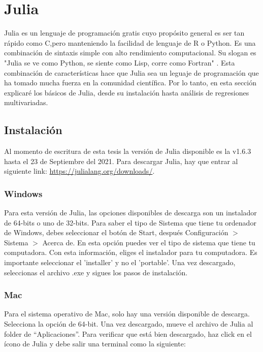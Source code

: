 \chapter{Julia}

Julia es un lenguaje de programación gratis cuyo propósito general es ser tan rápido como C,pero manteniendo la facilidad de lenguaje de R o Python. Es una combinación de sintaxis simple con alto rendimiento computacional. Su slogan es "Julia se ve como Python, se siente como Lisp, corre como Fortran" \citep{Hackers}. 
Esta combinación de características hace que Julia sea un leguaje de programación que ha tomado mucha fuerza en la comunidad científica. Por lo tanto, en esta sección explicaré los básicos de Julia, desde su instalación hasta análisis de regresiones multivariadas. 

\section{Instalación}
Al momento de escritura de esta tesis la versión de Julia disponible es la v1.6.3 hasta el 23 de Septiembre del 2021. Para descargar Julia, hay que entrar al siguiente link: \url{https://julialang.org/downloads/}. 

\subsection{Windows}
Para esta versión de Julia, las opciones disponibles de descarga son un instalador de 64-bits o uno de 32-bits. Para saber el tipo de Sistema que tiene tu ordenador de Windows, debes seleccionar el botón de Start, después Configuración $>$ Sistema $>$ Acerca de. En esta opción puedes ver el tipo de sistema que tiene tu computadora. Con esta información, eliges el instalador para tu computadora. Es importante seleccionar el 'installer' y no el 'portable'. Una vez descargado, seleccionas el archivo .exe y sigues los pasos de instalación. 


\subsection{Mac}
Para el sistema operativo de Mac, solo hay una versión disponible de descarga. Selecciona la opción de 64-bit. Una vez descargado, mueve el archivo de Julia al folder de \textquotedblleft Aplicaciones\textquotedblright. Para verificar que está bien descargado, haz click en el ícono de Julia y debe salir una terminal como la siguiente: 


